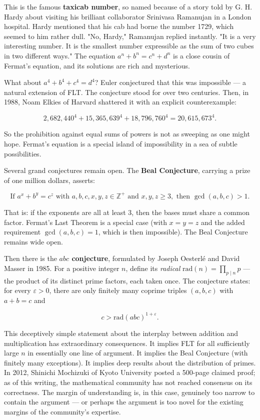 \documentclass[11pt,twoside,openright]{book}
\theoremstyle{definition}
\theoremstyle{remark}
\begin{document}
This is the famous \textbf{taxicab number}, so named because of a story told by G. H. Hardy about visiting his brilliant collaborator Srinivasa Ramanujan in a London hospital. Hardy mentioned that his cab had borne the number 1729, which seemed to him rather dull. "No, Hardy," Ramanujan replied instantly. "It is a very interesting number. It is the smallest number expressible as the sum of two cubes in two different ways." The equation $a^n + b^n = c^n + d^n$ is a close cousin of Fermat's equation, and its solutions are rich and mysterious.

What about $a^4 + b^4 + c^4 = d^4$? Euler conjectured that this was impossible --- a natural extension of FLT. The conjecture stood for over two centuries. Then, in 1988, Noam Elkies of Harvard shattered it with an explicit counterexample:

\[2{,}682{,}440^4 + 15{,}365{,}639^4 + 18{,}796{,}760^4 = 20{,}615{,}673^4.\]

So the prohibition against equal sums of powers is not as sweeping as one might hope. Fermat's equation is a special island of impossibility in a sea of subtle possibilities.

Several grand conjectures remain open. The \textbf{Beal Conjecture}, carrying a prize of one million dollars, asserts:

\[\text{If } a^x + b^y = c^z \text{ with } a, b, c, x, y, z \in \mathbb{Z}^+ \text{ and } x, y, z \ge 3, \text{ then } \gcd(a, b, c) > 1.\]

That is: if the exponents are all at least $3$, then the bases must share a common factor. Fermat's Last Theorem is a special case (with $x = y = z$ and the added requirement $\gcd(a,b,c) = 1$, which is then impossible). The Beal Conjecture remains wide open.

Then there is the \textbf{$abc$ conjecture}, formulated by Joseph Oesterl\'e and David Masser in 1985. For a positive integer $n$, define its \textit{radical} $\mathrm{rad}(n) = \prod_{p \mid n} p$ --- the product of its distinct prime factors, each taken once. The conjecture states: for every $\varepsilon > 0$, there are only finitely many coprime triples $(a, b, c)$ with $a + b = c$ and

\[c > \mathrm{rad}(abc)^{1 + \varepsilon}.\]

This deceptively simple statement about the interplay between addition and multiplication has extraordinary consequences. It implies FLT for all sufficiently large $n$ in essentially one line of argument. It implies the Beal Conjecture (with finitely many exceptions). It implies deep results about the distribution of primes. In 2012, Shinichi Mochizuki of Kyoto University posted a 500-page claimed proof; as of this writing, the mathematical community has not reached consensus on its correctness. The margin of understanding is, in this case, genuinely too narrow to contain the argument --- or perhaps the argument is too novel for the existing margins of the community's expertise.
\end{document}
